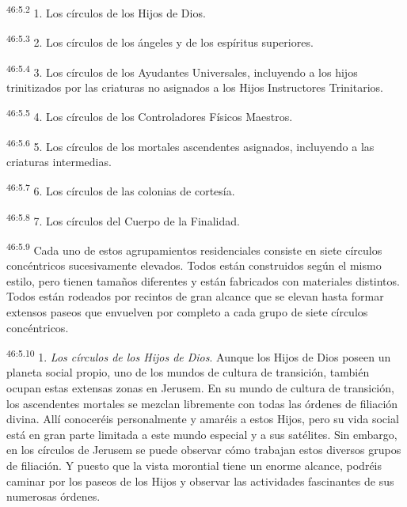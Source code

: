 \par
\textsuperscript{46:5.2} 1. Los círculos de los Hijos de Dios.

\par
\textsuperscript{46:5.3} 2. Los círculos de los ángeles y de los espíritus superiores.

\par
\textsuperscript{46:5.4} 3. Los círculos de los Ayudantes Universales, incluyendo a los hijos trinitizados por las criaturas no asignados a los Hijos Instructores Trinitarios.

\par
\textsuperscript{46:5.5} 4. Los círculos de los Controladores Físicos Maestros.

\par
\textsuperscript{46:5.6} 5. Los círculos de los mortales ascendentes asignados, incluyendo a las criaturas intermedias.

\par
\textsuperscript{46:5.7} 6. Los círculos de las colonias de cortesía.

\par
\textsuperscript{46:5.8} 7. Los círculos del Cuerpo de la Finalidad.

\par
\textsuperscript{46:5.9} Cada uno de estos agrupamientos residenciales consiste en siete círculos concéntricos sucesivamente elevados. Todos están construidos según el mismo estilo, pero tienen tamaños diferentes y están fabricados con materiales distintos. Todos están rodeados por recintos de gran alcance que se elevan hasta formar extensos paseos que envuelven por completo a cada grupo de siete círculos concéntricos.

\par
\textsuperscript{46:5.10} 1. \textit{Los círculos de los Hijos de Dios}. Aunque los Hijos de Dios poseen un planeta social propio, uno de los mundos de cultura de transición, también ocupan estas extensas zonas en Jerusem. En su mundo de cultura de transición, los ascendentes mortales se mezclan libremente con todas las órdenes de filiación divina. Allí conoceréis personalmente y amaréis a estos Hijos, pero su vida social está en gran parte limitada a este mundo especial y a sus satélites. Sin embargo, en los círculos de Jerusem se puede observar cómo trabajan estos diversos grupos de filiación. Y puesto que la vista morontial tiene un enorme alcance, podréis caminar por los paseos de los Hijos y observar las actividades fascinantes de sus numerosas órdenes.

